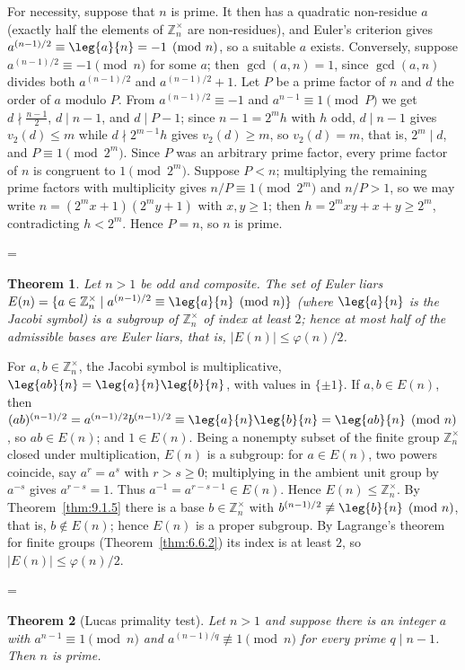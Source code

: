 \documentclass[11pt]{article}
\makeatletter
\theoremstyle{ntstyle}
\newtheorem{theorem}{Theorem}[subsection]
\let\nt@closedisplay\]
\def\nt@guardedclose{\@ifnextchar\par{\nt@closeafterpar}{\@ifnextchar\end{\postdisplaypenalty\@M\nt@closedisplay}{\nt@closedisplay}}}
\def\nt@closeafterpar\par{\@ifnextchar\par{\nt@closeafterpar}{\@ifnextchar\end{\postdisplaypenalty\@M\nt@closedisplay\par}{\nt@closedisplay\par}}}
\renewenvironment{proof}[1][\proofname]{\par
  \pushQED{\qed}\normalfont\topsep\medskipamount\edef\nt@afterproof{\@endparpenalty=\the\@endparpenalty\relax}\@beginparpenalty\@M\@endparpenalty\@M\let\]\nt@guardedclose\trivlist\item[]\textit{#1\@addpunct{.}} \ignorespaces}{\ifvmode\addpenalty\@M\fi\popQED\nt@afterproof\endtrivlist\@endpefalse}
\newcommand{\ZmodUnits}[1]{\mathbb{Z}_{#1}^{\times}}
\makeatother
\begin{document}
\begin{proof} For necessity, suppose that $n$ is prime. It then has
	a quadratic non-residue $a$ (exactly half the elements of $\ZmodUnits{n}$ are non-residues),
	and Euler's criterion gives $a^{(n-1)/2}\equiv\leg{a}{n}=-1\pmod{n}$,
	so a suitable $a$ exists. Conversely, suppose
	$a^{(n-1)/2}\equiv-1\pmod{n}$ for some $a$; then
	$\gcd(a, n)=1$, since $\gcd(a,n)$ divides both $a^{(n-1)/2}$ and $a^{(n-1)/2}+1$. Let $P$ be a prime factor of $n$ and $d$ the order of
	$a$ modulo $P$. From $a^{(n-1)/2}\equiv-1$ and $a^{n-1}\equiv1\pmod{P}$ we get $d\nmid\tfrac{n-1}{2}$, $d\mid n-1$, and $d\mid P-1$; since
	$n-1=2^{m}h$ with $h$ odd, $d\mid n-1$ gives $v_2(d)\le m$ while
	$d\nmid 2^{m-1}h$ gives $v_2(d)\ge m$, so $v_2(d)=m$, that is, $2^{m}\mid d$, and $P\equiv1\pmod{2^{m}}$.
	Since $P$ was an arbitrary prime factor, every prime factor of $n$ is
	congruent to $1\pmod{2^m}$. Suppose $P<n$; multiplying the remaining prime factors
	with multiplicity gives $n/P\equiv1\pmod{2^m}$ and $n/P>1$, so we may write
	$n=(2^{m}x+1)(2^{m}y+1)$ with $x,y\ge1$; then
	$h=2^{m}xy+x+y\ge2^{m}$, contradicting $h<2^{m}$. Hence $P=n$, so $n$
	is prime.

\end{proof}
\begin{theorem}\label{thm:9.1.7} Let
	$n>1$ be odd and composite. The set of Euler liars
	$E(n)=\{a\in\ZmodUnits{n} \mid a^{(n-1)/2}\equiv\leg{a}{n}\pmod{n}\}$ (where $\leg{a}{n}$ is the Jacobi
	symbol) is a subgroup of $\ZmodUnits{n}$ of index at least
	$2$; hence at most half of the admissible bases are Euler liars, that is, $|E(n)|\le\varphi(n)/2$.

\end{theorem}

\begin{proof} For $a,b\in\ZmodUnits{n}$, the
	Jacobi symbol is multiplicative,
	$\leg{ab}{n}=\leg{a}{n}\leg{b}{n}$, with values in $\{\pm1\}$. If $a,b\in E(n)$, then
	$(ab)^{(n-1)/2}=a^{(n-1)/2}b^{(n-1)/2}\equiv\leg{a}{n}\leg{b}{n}=\leg{ab}{n}\pmod{n}$, so
	$ab\in E(n)$; and $1\in E(n)$. Being a nonempty subset of the finite group $\ZmodUnits{n}$ closed under multiplication, $E(n)$ is a subgroup: for $a\in E(n)$, two powers coincide, say $a^r=a^s$ with $r>s\ge0$; multiplying in the ambient unit group by $a^{-s}$ gives $a^{r-s}=1$. Thus $a^{-1}=a^{r-s-1}\in E(n)$. Hence $E(n)\le\ZmodUnits{n}$. By Theorem~\ref{thm:9.1.5} there is a base
	$b\in\ZmodUnits{n}$ with $b^{(n-1)/2}\not\equiv\leg{b}{n}\pmod{n}$, that is, $b\notin E(n)$; hence $E(n)$ is a proper
	subgroup. By Lagrange's theorem for finite groups (Theorem~\ref{thm:6.6.2}) its index is at least $2$, so
	$|E(n)|\le\varphi(n)/2$.

\end{proof}
\begin{theorem}[Lucas primality test]\label{thm:9.1.8} Let $n>1$
	and suppose there is an integer $a$ with $a^{n-1}\equiv1\pmod{n}$ and
	$a^{(n-1)/q}\not\equiv1\pmod{n}$ for every prime $q\mid n-1$. Then $n$ is prime.

\end{theorem}
\end{document}
